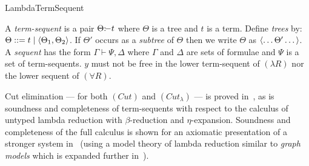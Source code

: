 \begin{entry}{LambdaTermSequent}

 \begin{clarifications}
A {\em term-sequent} is a pair $\Theta {{:}\!{-}} {t}$ where $\Theta$ is a tree and ${t}$ is a term. Define {\em trees} by: $\Theta::={t} \mid \langle \Theta_1,\Theta_2\rangle$. If $\Theta'$ occurs as a {\em subtree} of $\Theta$ then we write $\Theta$ as $\langle \dots\Theta'\dots\rangle$. A {\em sequent} has the form $\Gamma\vdash \Psi,\Delta$ where $\Gamma$ and $\Delta$ are sets of formulae and $\Psi$ is a set of term-sequents. ${y}$ must not be free in the lower term-sequent of $(\lambda R)$ nor the lower sequent of $(\forall R)$.
 \end{clarifications}


\begin{technicalities}
Cut elimination --- for both $(Cut)$ and $(Cut_{\lambda})$ --- is proved in~\cite{mgabbay:lambdacut}, as is soundness and completeness of term-sequents with respect to the calculus of untyped lambda reduction with $\beta$-reduction and $\eta$-expansion. Soundness and completeness of the full calculus is shown for an axiomatic presentation of a stronger system in~\cite{gabbay:simcks} (using a model theory of lambda reduction similar to {\em graph models} which is expanded further in~\cite{gabbay:simcmt,Gabbay2016}).
\end{technicalities}

\end{entry} 